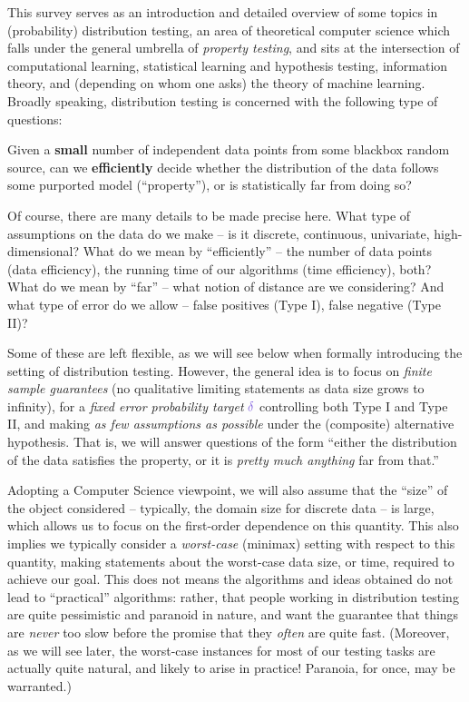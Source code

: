 This survey serves as an introduction and detailed overview of some topics in (probability) distribution testing, an area of theoretical computer science which falls under the general umbrella of \emph{property testing}, and sits at the intersection of computational learning, statistical learning and hypothesis testing, information theory, and (depending on whom one asks) the theory of machine learning. Broadly speaking, distribution testing is concerned with the following type of questions: 
\begin{framed}
 Given a \textbf{small} number of independent data points from some blackbox random source, can we \textbf{efficiently} decide whether the distribution of the data follows some purported model (``property''), or is statistically far from doing so?
\end{framed}

Of course, there are many details to be made precise here. What type of assumptions on the data do we make -- is it discrete, continuous, univariate, high-dimensional?  What do we mean by ``efficiently'' -- the number of data points (data efficiency), the running time of our algorithms (time efficiency), both? What do we mean by ``far'' -- what notion of distance are we considering? And what type of error do we allow -- false positives (Type I), false negative (Type II)?

Some of these are left flexible, as we will see below when formally introducing the setting of distribution testing. However, the general idea is to focus on \emph{finite sample guarantees} (no qualitative limiting statements as data size grows to infinity), for a \emph{fixed error probability target} $\errprob$ controlling both Type I and Type II, and making \emph{as few assumptions as possible} under the (composite) alternative hypothesis. That is, we will answer questions of the form ``either the distribution of the data satisfies the property, or it is \emph{pretty much anything} far from that.''


Adopting a Computer Science viewpoint, we will also assume that the ``size'' of the object considered -- typically, the domain size for discrete data -- is large, which allows us to focus on the first-order dependence on this quantity. This also implies we typically consider a \emph{worst-case} (minimax) setting with respect to this quantity, making statements about the worst-case data size, or time, required to achieve our goal. This does not means the algorithms and ideas obtained do not lead to ``practical'' algorithms: rather, that people working in distribution testing are quite pessimistic and paranoid in nature, and want the guarantee that things are \emph{never} too slow before the promise that they \emph{often} are quite fast. (Moreover, as we will see later, the worst-case instances for most of our testing tasks are actually quite natural, and likely to arise in practice! Paranoia, for once, may be warranted.)

